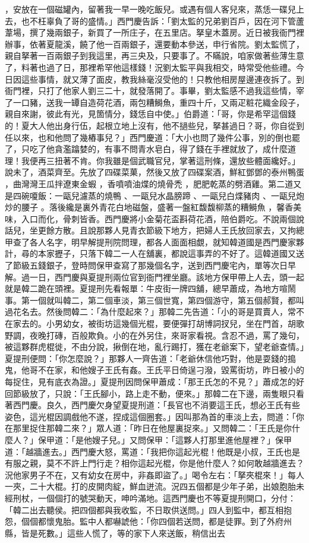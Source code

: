 ，安放在一個磁罐內，留著我一早一晚吃飯兒。或遇有個人客兒來，蒸恁一碟兒上去，也不枉辜負了哥的盛情。」西門慶告訴：「劉太監的兄弟劉百戶，因在河下管蘆葦場，撰了幾兩銀子，新買了一所庄子，在五里店。拏皇木蓋房。近日被我衙門裡辦事，依著夏龍溪，饒了他一百兩銀子，還要動本參送，申行省院。劉太監慌了，親自拏著一百兩銀子到我這里，再三央及，只要事了。不瞞說，咱家做著些薄生意了，料著也過了日，那裡希罕他這樣錢！況劉太監平與我相交，時常受他些禮。今日因這些事情，就又薄了面皮，教我絲毫沒受他的！只教他相房屋邊連夜拆了。到衙門裡，只打了他家人劉三二十，就發落開了。事畢，劉太監感不過我這些情，宰了一口豬，送我一罈自造荷花酒，兩包糟鰣魚，重四十斤，又兩疋粧花織金段子，親自來謝，彼此有光，見箇情分，錢恁自中使。」伯爵道：「哥，你是希罕這個錢的！夏大人他出身行伍，起根立地上沒有，他不撾些兒，拏甚過日？哥，你自從到任以來，也和他問了幾樁事兒？」西門慶道：「大小也問了幾件公事，別的倒也罷了，只吃了他貪濫蹹婪的，有事不問青水皂白，得了錢在手裡就放了，成什麼道理！我便再三扭著不肯。你我雖是個武職官兒，掌著這刑條，還放些體面纔好。」說未了，酒菜齊至。先放了四碟菜菓，然後又放了四碟案酒，鮮紅鄧鄧的泰州鴨蛋 ，曲灣灣王瓜拌遼東金蝦 ，香噴噴油煠的燒骨禿 ，肥肥乾蒸的劈酒雞。第二道又是四碗嗄飯：一甌兒濾蒸的燒鴨 、一甌兒水晶膀蹄 、一甌兒白煠豬肉 、一甌兒炮炒的腰子 。落後纔是裏外青花白地磁盤，盛著一盤紅馥馥柳蒸的糟鰣魚 ，馨香美味，入口而化，骨刺皆香。西門慶將小金菊花盃斟荷花酒，陪伯爵吃。不說兩個說話兒，坐更餘方散。且說那夥人見青衣節級下地方，把婦人王氏放回家去，又拘總甲查了各人名字，明早解提刑院問理，都各人面面相覷，就知韓道國是西門慶家夥計，尋的本家攊子，只落下韓二一人在舖裏，都說這事弄的不好了。這韓道國又送了節級五錢銀子，登時問保甲查寫了那幾個名字，送到西門慶宅內，單等次日早解。過一日，西門慶與夏提刑兩位官到衙門裡坐廳。該地方保甲帶上人去，頭一起就是韓二跪在頭裡。夏提刑先看報單：牛皮街一牌四舖，總早蕭成，為地方喧鬧事。第一個就叫韓二，第二個車淡，第三個世寬，第四個游守，第五個郝賢，都叫過花名去。然後問韓二：「為什麼起來？」那韓二先告道：「小的哥是買賣人，常不在家去的。小男幼女，被街坊這幾個光棍，要便彈打胡博詞扠兒，坐在門首，胡歌野調，夜晚打磚，百般欺負。小的在外另住，來哥家看視。含忍不過，罵了幾句，被這夥群虎棍徙，不由分說，揪倒在地，亂行踢打，獲在老爺案下，望老爺查情。」夏提刑便問：「你怎麼說？」那夥人一齊告道：「老爺休信他巧對，他是耍錢的搗鬼，他哥不在家，和他嫂子王氏有姦。王氏平日倚逞刁潑，毀罵街坊，昨日被小的每捉住，見有底衣為證。」夏提刑因問保甲蕭成：「那王氏怎的不見？」蕭成怎的好回節級放了，只說：「王氏腳小，路上走不動，便來。」那韓二在下邊，兩隻眼只看著西門慶。良久，西門慶欠身望夏提刑道：「長官也不消要這王氏，想必王氏有些姿色，這光棍因調戲他不遂，捏成這個圈套。」因叫那為首的車淡上去，問道：「你在那里捉住那韓二來？」眾人道：「昨日在他屋裏捉來。」又問韓二：「王氏是你什麼人？」保甲道：「是他嫂子兒。」又問保甲：「這夥人打那里進他屋裡？」保甲道：「越牆進去。」西門慶大怒，罵道：「我把你這起光棍！他既是小叔，王氏也是有服之親，莫不不許上門行走？相你這起光棍，你是他什麼人？如何敢越牆進去？況他家男子不在，又有幼女在房中，非姦即盜了。」喝令左右：「拏夾棍來！」每人一夾，二十大棍。打的皮開肉綻，鮮血迸流。況四五個都是少年子弟，出娘胞胎未經刑杖，一個個打的號哭動天，呻吟滿地。這西門慶也不等夏提刑開口，分付：「韓二出去聽侯。把四個都與我收監，不日取供送問。」四人到監中，都互相抱怨，個個都懷鬼胎。監中人都嚇諕他：「你四個若送問，都是徒罪。到了外府州縣，皆是死數。」這些人慌了，等的家下人來送飯，稍信出去